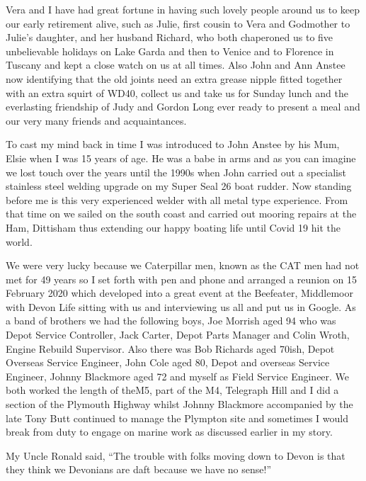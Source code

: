 Vera and I have had great fortune in having such lovely people around us to keep
our early retirement alive, such as Julie, first cousin to Vera and Godmother
to Julie's daughter, and her husband Richard, who both chaperoned us to five
unbelievable holidays on Lake Garda and then to Venice and to Florence in
Tuscany and kept a close watch on us at all times.  Also John and Ann Anstee
now identifying that the old joints need an extra grease nipple fitted together
with an extra squirt of WD40, collect us and take us for Sunday lunch and the
everlasting friendship of Judy and Gordon Long ever ready to present a meal and
our very many friends and acquaintances.

To cast my mind back in time I was introduced to John Anstee by his Mum, Elsie
when I was 15 years of age.  He was a babe in arms and as you can imagine we
lost touch over the years until the 1990s when John carried out a specialist
stainless steel welding upgrade on my Super Seal 26 boat rudder.  Now standing
before me is this very experienced welder with all metal type experience.  From
that time on we sailed on the south coast and carried out mooring repairs at
the Ham, Dittisham thus extending our happy boating life until Covid 19 hit the
world.

We were very lucky because we Caterpillar men, known as the CAT men had not met
for 49 years so I set forth with pen and phone and arranged a reunion on 15
February 2020 which developed into a great event at the Beefeater, Middlemoor
with Devon Life sitting with us and interviewing us all and put us in Google.
As a band of brothers we had the following boys, Joe Morrish aged 94 who was
Depot Service Controller, Jack Carter, Depot Parts Manager and Colin Wroth,
Engine Rebuild Supervisor.  Also there was Bob Richards aged 70ish, Depot
Overseas Service Engineer, John Cole aged 80, Depot and overseas Service
Engineer, Johnny Blackmore aged 72 and myself as Field Service Engineer.  We
both worked the length of theM5, part of the M4, Telegraph Hill and I did a
section of the Plymouth Highway whilst Johnny Blackmore accompanied by the late
Tony Butt continued to manage the Plympton site and sometimes I would break
from duty to engage on marine work as discussed earlier in my story.

My Uncle Ronald said, ``The trouble with folks moving down to Devon is that they
think we Devonians are daft because we have no sense!''
